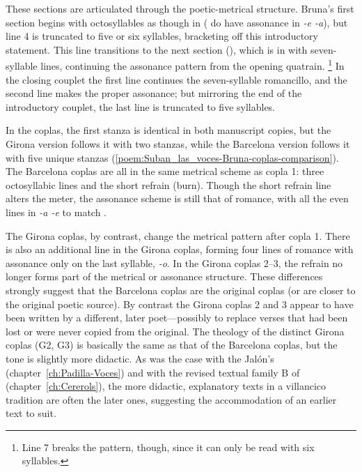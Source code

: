 % 	
% 
% 	

These sections are articulated through the poetic-metrical structure.
Bruna's first section begins with octosyllables as though in  ( do have assonance in \emph{-e -a}), but line 4 is truncated to five or six syllables, bracketing off this introductory statement.
This line transitions to the next section (), which is in  with seven-syllable lines, continuing the assonance pattern from the opening quatrain.%
	\footnote{%
	Line 7 breaks the pattern, though, since it can only be read with six syllables.
	}
In the closing couplet the first line continues the seven-syllable romancillo, and the second line makes the proper assonance; but mirroring the end of the introductory couplet, the last line is truncated to five syllables.

In the coplas, the first stanza is identical in both manuscript copies, but the Girona version follows it with two stanzas, while the Barcelona version follows it with five unique stanzas (\cref{poem:Suban_las_voces-Bruna-coplas-comparison}).
The Barcelona coplas are all in the same metrical scheme as copla 1: three octosyllabic lines and the short refrain  (burn).
Though the short refrain line alters the meter, the assonance scheme is still that of romance, with all the even lines in \emph{-a -e} to match .

The Girona coplas, by contrast, change the metrical pattern after copla 1.
There is also an additional line in the Girona coplas, forming four lines of romance with assonance only on the last syllable, \emph{-o}.
In the Girona coplas 2--3, the  refrain no longer forms part of the metrical or assonance structure.
These differences strongly suggest that the Barcelona coplas are the original coplas (or are closer to the original poetic source).
By contrast the Girona coplas 2 and 3 appear to have been written by a different, later poet---possibly to replace verses that had been lost or were never copied from the original.
The theology of the distinct Girona coplas (G2, G3) is basically the same as that of the Barcelona coplas, but the tone is slightly more didactic.
As was the case with the Jalón's  (chapter~\ref{ch:Padilla-Voces}) and with the revised textual family B of  (chapter~\ref{ch:Cererols}), the more didactic, explanatory texts in a villancico tradition are often the later ones, suggesting the accommodation of an earlier text to suit.

